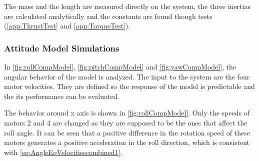 The mass and the length are measured directly on the system, the three inertias are calculated analytically and the constants are found though tests (\autoref{app:ThrustTest} and \ref{app:TorqueTest}).

\subsubsection{Attitude Model Simulations}
In \autoref{fig:rollCompModel}, \ref{fig:pitchCompModel} and \ref{fig:yawCompModel}, the angular behavior of the model is analyzed. The input to the system are the four motor velocities. They are defined so the response of the model is predictable and the its performance can be evaluated.

The behavior around x axis is shown in \autoref{fig:rollCompModel}. Only the speeds of motors 2 and 4 are changed as they are supposed to be the ones that affect the roll angle. It can be seen that a positive difference in the rotation speed of these motors generates a positive acceleration in the roll direction, which is consistent with \autoref{eq:AngleEqVelocitiescombined1}.

